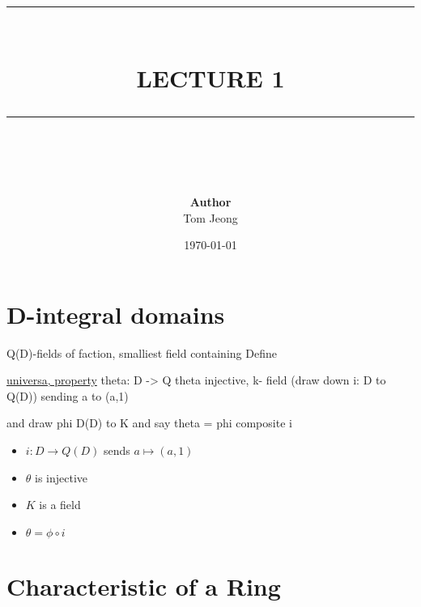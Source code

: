 \documentclass{article}
\newcommand{\HRule}[1]{\rule{\linewidth}{#1}}
\begin{document}

\title{ \normalsize \textsc{}
		\\ [2.0cm]
		\HRule{1.5pt} \\
		\LARGE \textbf{\uppercase{Lecture 1}}
		\HRule{2.0pt} \\ [0.6cm] \LARGE{}
		}

\date{\today}
\author{\textbf{Author} \\ 
		Tom Jeong
        }

\maketitle

\tableofcontents
\newpage

\section{D-integral domains}
Q(D)-fields of faction, smalliest field containing Define

\underline{universa, property}
theta: D -> Q theta injective, k- field
(draw down i: D to Q(D))  sending a to (a,1) 

and draw phi D(D) to K 
and say theta = phi composite i 
\\ 

    \begin{itemize}
        \item $i: D \to Q(D)$ sends $a \mapsto (a,1)$
        \item $\theta$ is injective
        \item $K$ is a field
        \item $\theta = \phi \circ i$
        \end{itemize}    


 
        \section{Characteristic of a Ring}
\end{document}
